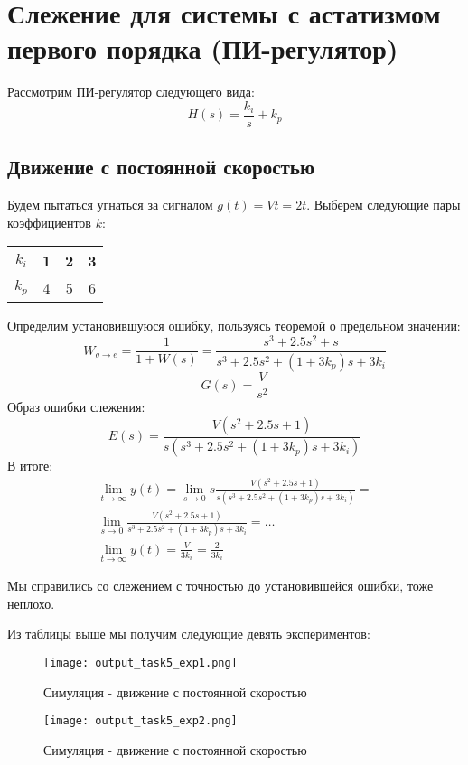 \chapter{Слежение для системы с астатизмом первого порядка (ПИ-регулятор)}
\label{ch:chap5}


Рассмотрим ПИ-регулятор следующего вида:
$$
H(s) = \frac{k_i}{s} + k_p
$$


\section{Движение с постоянной скоростью}
Будем пытаться угнаться за сигналом $g(t) = Vt = 2t$.
Выберем следующие пары коэффициентов $k$:

\begin{center}
  \begin{tabular}{ |c|c|c|c|} 
    \hline
    $k_i$  & 1   & 2  & 3 \\
    \hline
    $k_p$  & 4   & 5  & 6  \\
   \hline
   \end{tabular}     
\end{center}



Определим установившуюся ошибку, пользуясь теоремой о предельном значении:
$$
W_{g\to e} = \frac{1}{1+W(s)} = \frac{s^3 + 2.5s^2 + s}{s^3 + 2.5s^2 + (1+3k_p)s + 3k_i}
$$
$$
G(s) = \frac{V}{s^2}
$$
Образ ошибки слежения:
$$
E(s) = \frac{V(s^2 + 2.5s + 1)}{s(s^3 + 2.5s^2 + (1+3k_p)s + 3k_i)}
$$
В итоге:
$$
\begin{aligned}
  \lim_{t\to\infty} y(t) = \lim_{s\to 0}s\frac{V(s^2 + 2.5s + 1)}{s(s^3 + 2.5s^2 + (1+3k_p)s + 3k_i)} =  \\
  \lim_{s\to 0}\frac{V(s^2 + 2.5s + 1)}{s^3 + 2.5s^2 + (1+3k_p)s + 3k_i} = \dots \\
  \lim_{t\to\infty} y(t) = \frac{V}{3k_i} = \frac{2}{3k_i}
\end{aligned}
$$

Мы справились со слежением с точностью до установившейся ошибки, тоже неплохо.

Из таблицы выше мы получим следующие девять экспериментов:

\begin{figure}[ht]
  \centering
  \texttt{[image: output\_task5\_exp1.png]}
\caption{Симуляция - движение с постоянной скоростью}
\end{figure}

\newpage
\begin{figure}[ht]
  \centering
  \texttt{[image: output\_task5\_exp2.png]}
\caption{Симуляция - движение с постоянной скоростью}
\end{figure}

